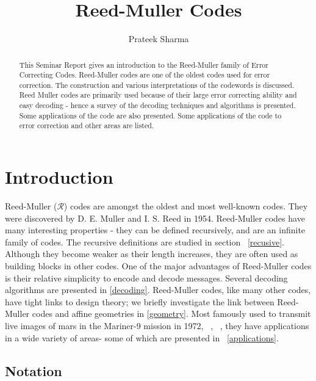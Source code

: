 \documentclass{article}
\title{Reed-Muller Codes}
\author{Prateek Sharma}
\theoremstyle{plain}
\begin{document}


\maketitle

\begin{abstract} 
This Seminar Report gives an introduction to the Reed-Muller family of Error Correcting Codes. Reed-Muller codes are one of the oldest codes used for error correction. The construction and various interpretations of the codewords is discussed. Reed Muller codes are primarily used because of their large error correcting ability and easy decoding - hence a survey of the decoding techniques and algorithms is presented. Some applications of the code are also presented. Some applications of the code to error correction and other areas are listed.
\end{abstract}


\section {Introduction}


Reed-Muller ($\mathcal{R}$) codes are amongst the oldest and most well-known codes. They were discovered by D. E. Muller and I. S. Reed in 1954. \cite{reed} \cite{muller}
Reed-Muller codes have many interesting properties - they can be defined recursively, and are an infinite family of codes. The recursive definitions are studied in section ~\ref{recusive}.
Although they become weaker as their length increases, they are often used as building blocks in other codes. One of the major advantages of Reed-Muller codes is their relative simplicity to encode and decode messages. Several decoding algorithms are presented in \ref{decoding}.  Reed-Muller codes, like many other codes, have tight links to design theory; we briefly investigate the link between Reed-Muller codes and affine geometries in \ref{geometry}.
Most famously used to transmit live images of mars in the Mariner-9 mission in 1972, ~\cite{space},~\cite{sloane} , they have applications in a wide variety of areas- some of which are presented in ~\ref{applications}.


\subsection {Notation}
\label{notation}

\end{document}
